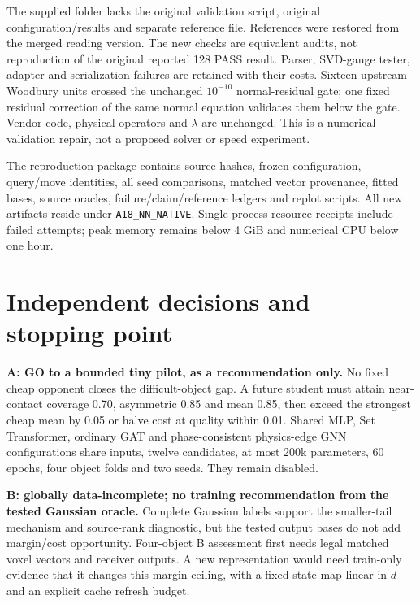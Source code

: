 \documentclass[11pt,a4paper]{article}
\newcommand{\code}[1]{\texttt{#1}}
\begin{document}
The supplied folder lacks the original validation script, original configuration/results and separate reference file. References were restored from the merged reading version. The new checks are equivalent audits, not reproduction of the original reported 128 PASS result. Parser, SVD-gauge tester, adapter and serialization failures are retained with their costs. Sixteen upstream Woodbury units crossed the unchanged $10^{-10}$ normal-residual gate; one fixed residual correction of the same normal equation validates them below the gate. Vendor code, physical operators and $\lambda$ are unchanged. This is a numerical validation repair, not a proposed solver or speed experiment.

The reproduction package contains source hashes, frozen configuration, query/move identities, all seed comparisons, matched vector provenance, fitted bases, source oracles, failure/claim/reference ledgers and replot scripts. All new artifacts reside under \code{A18\_NN\_NATIVE}. Single-process resource receipts include failed attempts; peak memory remains below 4 GiB and numerical CPU below one hour.

\section{Independent decisions and stopping point}
\textbf{A: GO to a bounded tiny pilot, as a recommendation only.} No fixed cheap opponent closes the difficult-object gap. A future student must attain near-contact coverage 0.70, asymmetric 0.85 and mean 0.85, then exceed the strongest cheap mean by 0.05 or halve cost at quality within 0.01. Shared MLP, Set Transformer, ordinary GAT and phase-consistent physics-edge GNN configurations share inputs, twelve candidates, at most 200k parameters, 60 epochs, four object folds and two seeds. They remain disabled.

\textbf{B: globally data-incomplete; no training recommendation from the tested Gaussian oracle.} Complete Gaussian labels support the smaller-tail mechanism and source-rank diagnostic, but the tested output bases do not add margin/cost opportunity. Four-object B assessment first needs legal matched voxel vectors and receiver outputs. A new representation would need train-only evidence that it changes this margin ceiling, with a fixed-state map linear in $d$ and an explicit cache refresh budget.
\end{document}
